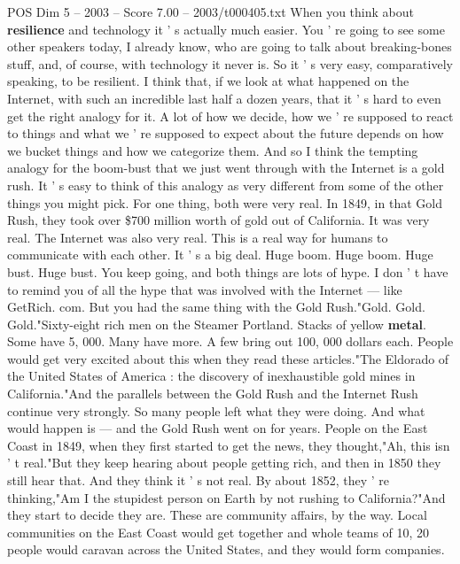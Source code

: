 \begin{textsample}{POS Dim 5 – 2003 – Score 7.00 – 2003/t000405.txt}  \label{ex:f5_pos_023}
When you think about \textbf{resilience} and technology it ' s actually much easier.
You ' re going to see some other speakers today, I already know, who are going to talk about breaking-bones stuff, and, of course, with technology it never is.
So it ' s very easy, comparatively speaking, to be resilient.
I think that, if we look at what happened on the Internet, with such an incredible last half a dozen years, that it ' s hard to even get the right analogy for it.
A lot of how we decide, how we ' re supposed to react to things and what we ' re supposed to expect about the future depends on how we bucket things and how we categorize them.
And so I think the tempting analogy for the boom-bust that we just went through with the Internet is a gold rush.
It ' s easy to think of this analogy as very different from some of the other things you might pick.
For one thing, both were very real.
In 1849, in that Gold Rush, they took over \$700 million worth of gold out of California.
It was very real.
The Internet was also very real.
This is a real way for humans to communicate with each other.
It ' s a big deal.
Huge boom.
Huge boom.
Huge bust.
Huge bust.
You keep going, and both things are lots of hype.
I don ' t have to remind you of all the hype that was involved with the Internet — like GetRich. com.
But you had the same thing with the Gold Rush."Gold.
Gold.
Gold."Sixty-eight rich men on the Steamer Portland.
Stacks of yellow \textbf{metal}.
Some have 5, 000.
Many have more.
A few bring out 100, 000 dollars each.
People would get very excited about this when they read these articles."The Eldorado of the United States of America : the discovery of inexhaustible gold mines in California."And the parallels between the Gold Rush and the Internet Rush continue very strongly.
So many people left what they were doing.
And what would happen is — and the Gold Rush went on for years.
People on the East Coast in 1849, when they first started to get the news, they thought,"Ah, this isn ' t real."But they keep hearing about people getting rich, and then in 1850 they still hear that.
And they think it ' s not real.
By about 1852, they ' re thinking,"Am I the stupidest person on Earth by not rushing to California?"And they start to decide they are.
These are community affairs, by the way.
Local communities on the East Coast would get together and whole teams of 10, 20 people would caravan across the United States, and they would form companies.

\end{textsample}

